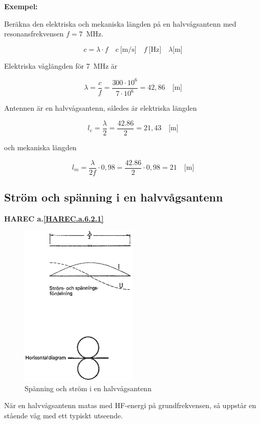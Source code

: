 \textbf{Exempel:}

Beräkna den elektriska och mekaniska längden på en halvvågsantenn med
resonansfrekvensen \(f = 7\)~MHz.

\[
c = \lambda \cdot f
\quad c\ \text{[m/s]} \quad f\ \text{[Hz]} \quad \lambda \text{[m]}
\]

Elektriska våglängden för 7~MHz är

\[
\lambda = \frac{c}{f} = \frac{300 \cdot 10^6}{7 \cdot 10^6} = 42,86
\quad \text{[m]}
\]

Antennen är en halvvågsantenn, således är elektriska längden

\[
l_e = \frac{\lambda}{2} = \frac{42.86}{2} = 21,43 \quad \text{[m]}
\]

och mekaniska längden

\[
l_m = \frac{\lambda}{2f} \cdot 0,98 = \frac{42.86}{2}\cdot 0,98 = 21
\quad \text{[m]}
\]


\subsection{Ström och spänning i en halvvågsantenn}
\textbf{
HAREC a.\ref{HAREC.a.6.2.1}\label{myHAREC.a.6.2.1}
}

\begin{figure}
  \includegraphics[width=0.5\textwidth]{images/cropped_pdfs/bild_2_6-01.pdf}
  \caption{Spänning och ström i en halvvågsantenn}
  \label{fig:bildII6-1}
\end{figure}

När en halvvågsantenn matas med HF-energi på grundfrekvensen, så uppstår en
stående våg med ett typiskt utseende.

